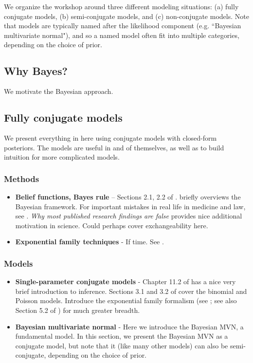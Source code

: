 \documentclass{article} %
\begin{document}
We organize the workshop around three different modeling situations: (a) fully conjugate models, (b) semi-conjugate models, and (c) non-conjugate models. Note that models are typically named after the likelihood component (e.g. ``Bayesian multivariate normal"), and so a named model often fit into multiple categories, depending on the choice of prior.

\subsection{Why Bayes?}

We motivate the Bayesian approach.

\subsection{Fully conjugate models}

We present everything in here using conjugate models with closed-form posteriors.  The models are useful in and of themselves,  as well as to build intuition for more complicated models.   

\subsubsection{Methods}
	\begin{itemize}
	\item \textbf{Belief functions,  Bayes rule} -- Sections 2.1,  2.2 of \cite{hoff2009first}.   \cite{ghahramani2013bayesian} briefly overviews the Bayesian framework.   For important mistakes in real life in medicine and law,  see \cite{guardianXXXXobscure}.  \textit{Why most published research findings are false} \cite{ioannidis2005most} provides nice additional motivation in science.    Could perhaps cover exchangeability here. 
	\item \textbf{Exponential family techniques} - If time.  See \cite{wojnowiczXXXXexponential}.
	\end{itemize}
\subsubsection{Models}
\begin{itemize}
	\item \textbf{Single-parameter conjugate models} - Chapter 11.2 of \cite{davison2003statistical} has a nice very brief introduction to inference.      Sections 3.1 and 3.2 of \cite{hoff2009first} cover the  binomial and Poisson models.   Introduce the exponential family formalism (see \cite{wojnowiczXXXXexponential};  see also Section 5.2 of \cite{davison2003statistical} ) for much greater breadth.  
	\item \textbf{Bayesian multivariate normal} -  Here we introduce the Bayesian MVN, a fundamental model. In this section, we present the Bayesian MVN as a conjugate model, but note that it (like many other models) can also be semi-conjugate,  depending on the choice of prior.
	\end{itemize}   
\end{document}

